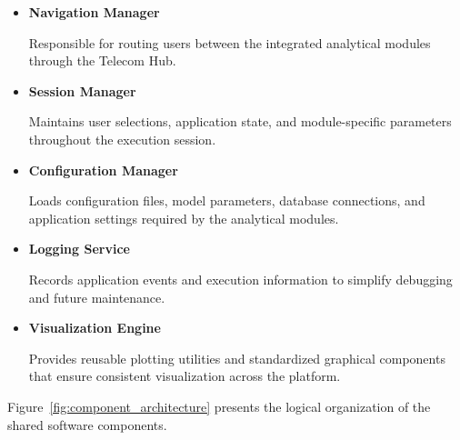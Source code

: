 \begin{itemize}

\item \textbf{Navigation Manager}

Responsible for routing users between the integrated analytical modules through the Telecom Hub.

\item \textbf{Session Manager}

Maintains user selections, application state, and module-specific parameters throughout the execution session.

\item \textbf{Configuration Manager}

Loads configuration files, model parameters, database connections, and application settings required by the analytical modules.

\item \textbf{Logging Service}

Records application events and execution information to simplify debugging and future maintenance.

\item \textbf{Visualization Engine}

Provides reusable plotting utilities and standardized graphical components that ensure consistent visualization across the platform.

\end{itemize}

Figure~\ref{fig:component_architecture} presents the logical organization of the shared software components.



